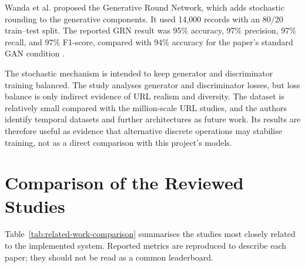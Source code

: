 Wanda et al. proposed the Generative Round Network, which adds stochastic
rounding to the generative components. It used 14,000 records with an 80/20
train--test split. The reported GRN result was 95\% accuracy, 97\% precision,
97\% recall, and 97\% F1-score, compared with 94\% accuracy for the paper's
standard GAN condition \citep{wanda2025deep}.

The stochastic mechanism is intended to keep generator and discriminator
training balanced. The study analyses generator and discriminator losses, but
loss balance is only indirect evidence of URL realism and diversity. The
dataset is relatively small compared with the million-scale URL studies, and
the authors identify temporal datasets and further architectures as future
work. Its results are therefore useful as evidence that alternative discrete
operations may stabilise training, not as a direct comparison with this
project's models.

\section{Comparison of the Reviewed Studies}

Table~\ref{tab:related-work-comparison} summarises the studies most closely
related to the implemented system. Reported metrics are reproduced to describe
each paper; they should not be read as a common leaderboard.

